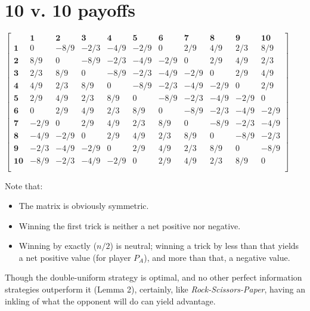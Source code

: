 \documentclass[11pt, oneside]{article} 	%
\begin{document}
\section{10 v. 10 payoffs}

\setcounter{MaxMatrixCols}{20}

$\begin{bmatrix}
& \mathbf{1} & \mathbf{2}  & \mathbf{3} & \mathbf{4} & \mathbf{5} & \mathbf{6}  &\mathbf{7}  & \mathbf{8} &\mathbf{9}  & \mathbf{10} \\  
\mathbf{1} & 0 & -8/9 & -2/3 & -4/9 & -2/9 & 0 & 2/9 & 4/9 & 2/3 & 8/9 \\
\mathbf{2} & 8/9 & 0 & -8/9 & -2/3 & -4/9 & -2/9 & 0 & 2/9 & 4/9 & 2/3 \\
\mathbf{3} & 2/3 & 8/9 & 0 & -8/9 & -2/3 & -4/9 & -2/9 & 0 & 2/9 & 4/9 \\
\mathbf{4} & 4/9 & 2/3 & 8/9 & 0 & -8/9 & -2/3 & -4/9 & -2/9 & 0 & 2/9 \\
\mathbf{5} & 2/9 & 4/9 & 2/3 & 8/9 & 0 & -8/9 & -2/3 & -4/9 & -2/9 & 0 \\
\mathbf{6} & 0 & 2/9 & 4/9 & 2/3 & 8/9 & 0 & -8/9 & -2/3 & -4/9 & -2/9 \\
\mathbf{7} & -2/9 & 0 & 2/9 & 4/9 & 2/3 & 8/9 & 0 & -8/9 & -2/3 & -4/9 \\
\mathbf{8} & -4/9 & -2/9 & 0 & 2/9 & 4/9 & 2/3 & 8/9 & 0 & -8/9 & -2/3 \\
\mathbf{9} & -2/3 & -4/9 & -2/9 & 0 & 2/9 & 4/9 & 2/3 & 8/9 & 0 & -8/9 \\
\mathbf{10} & -8/9 & -2/3 & -4/9 & -2/9 & 0 & 2/9 & 4/9 & 2/3 & 8/9 & 0 \\
\end{bmatrix}
$

Note that:

\begin{itemize}
\item The matrix is obviously symmetric.
\item Winning the first trick is neither a net positive nor negative.
\item Winning by exactly ($n/2$) is neutral; winning a trick by less than that yields a net positive value (for player $P_A$), and more than that, a negative value.
\end{itemize}

Though the double-uniform strategy is optimal, and no other perfect information strategies outperform it (Lemma 2), certainly, like \emph{Rock-Scissors-Paper}, having an inkling of what the opponent will do can yield advantage.  
\end{document}
